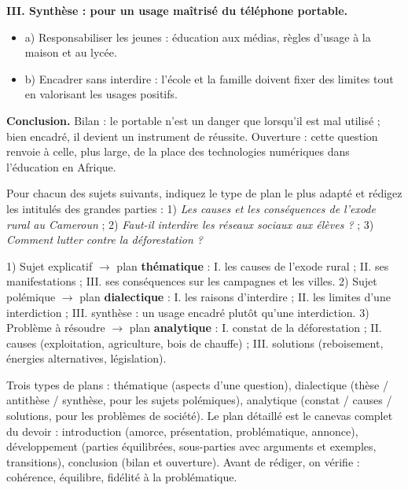\documentclass[11pt]{article}
\newcommand{\cle}[1]{{\popxbold\color{popdark}#1}}
\begin{document}
\begin{exoresolu}
\textbf{III. Synthèse : pour un usage maîtrisé du téléphone portable.}
\begin{itemize}
\item a) Responsabiliser les jeunes : éducation aux médias, règles d'usage à la maison et au lycée.
\item b) Encadrer sans interdire : l'école et la famille doivent fixer des limites tout en valorisant les usages positifs.
\end{itemize}

\textbf{Conclusion.} Bilan : le portable n'est un danger que lorsqu'il est mal utilisé ; bien encadré, il devient un instrument de réussite. Ouverture : cette question renvoie à celle, plus large, de la place des technologies numériques dans l'éducation en Afrique.
\end{exoresolu}

\begin{exercice}
Pour chacun des sujets suivants, indiquez le type de plan le plus adapté et rédigez les intitulés des grandes parties : 1) \emph{Les causes et les conséquences de l'exode rural au Cameroun} ; 2) \emph{Faut-il interdire les réseaux sociaux aux élèves ?} ; 3) \emph{Comment lutter contre la déforestation ?}
\end{exercice}

\begin{corrige}[Exercice]
1) Sujet explicatif $\rightarrow$ plan \textbf{thématique} : I. les causes de l'exode rural ; II. ses manifestations ; III. ses conséquences sur les campagnes et les villes. 2) Sujet polémique $\rightarrow$ plan \textbf{dialectique} : I. les raisons d'interdire ; II. les limites d'une interdiction ; III. synthèse : un usage encadré plutôt qu'une interdiction. 3) Problème à résoudre $\rightarrow$ plan \textbf{analytique} : I. constat de la déforestation ; II. causes (exploitation, agriculture, bois de chauffe) ; III. solutions (reboisement, énergies alternatives, législation).
\end{corrige}

\begin{aretenir}[L'essentiel]
Trois types de plans : \cle{thématique} (aspects d'une question), \cle{dialectique} (thèse / antithèse / synthèse, pour les sujets polémiques), \cle{analytique} (constat / causes / solutions, pour les problèmes de société). Le \cle{plan détaillé} est le canevas complet du devoir : introduction (amorce, présentation, problématique, annonce), développement (parties équilibrées, sous-parties avec arguments et exemples, transitions), conclusion (bilan et ouverture). Avant de rédiger, on vérifie : cohérence, équilibre, fidélité à la problématique.
\end{aretenir}
\end{document}
